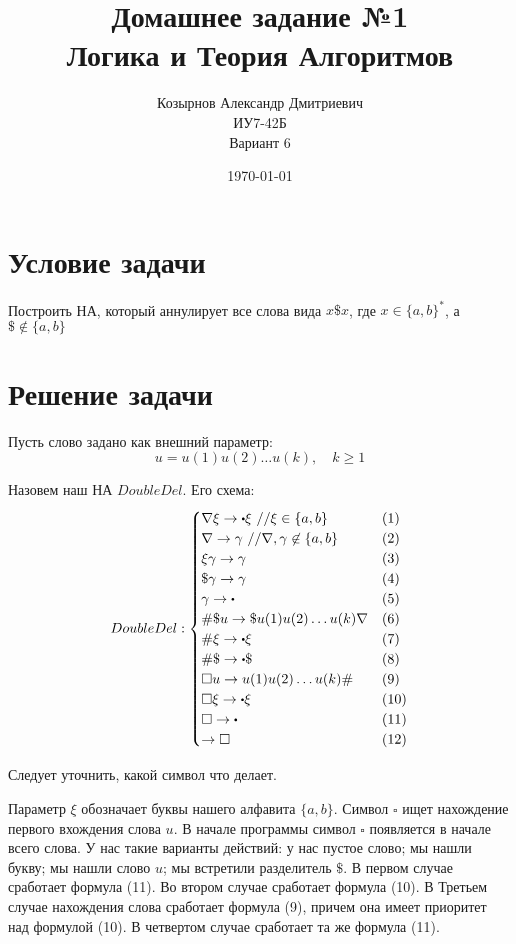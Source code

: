

\title{Домашнее задание №1\\ Логика и Теория Алгоритмов}
\author{Козырнов Александр Дмитриевич\\ ИУ7-42Б\\Вариант 6}
\date{\today}


\maketitle
\tableofcontents
\newpage

\section{Условие задачи}
Построить НА, который аннулирует все слова вида $x\$x$, где
$x \in \{a,b\}^{*}$, а $\$ \not\in \{a,b\} $

\section{Решение задачи}
Пусть слово задано как внешний параметр:
\begin{equation*}
    \boxed{u = u(1)u(2)\ldots u(k),\quad k \ge 1}
\end{equation*}

Назовем наш НА $DoubleDel$. Его схема:
\[
DoubleDel: \begin{cases}
    \nabla\xi \to \bigcdot \xi \text{ //} \xi \in \{a,b\}  & (1)\\
    \nabla  \to \gamma \text{ //}\nabla, \gamma  \not\in \{a,b\} & (2)\\
    \xi\gamma \to \gamma & (3)\\
    \$\gamma \to \gamma & (4)\\
    \gamma  \to \bigcdot & (5)\\
    \#\$u \to \$u(1)u(2)\ldots u(k)\nabla  & (6)\\
    \#\xi \to \bigcdot\xi & (7)\\
    \#\$ \to \bigcdot\$ & (8)\\
    \square u \to u(1)u(2)\ldots u(k) \# & (9)\\
    \square\xi \to \bigcdot \xi & (10)\\
    \square \to \bigcdot& (11) \\
    \to \square & (12)
\end{cases}
\]

Следует уточнить, какой символ что делает.

Параметр $\xi$ обозначает буквы нашего алфавита
 $\{a,b\}$.  Символ $\square$ ищет нахождение первого вхождения слова $u$. В начале программы 
 символ $\square$ появляется в начале всего слова. У нас такие варианты действий:
 у нас пустое слово; мы нашли букву; мы нашли слово  $u$; мы встретили разделитель $\$$.
 В первом случае сработает формула (11). Во втором случае сработает формула (10).
 В Третьем случае нахождения слова сработает формула (9), причем она имеет приоритет над формулой
 (10). В четвертом случае сработает та же формула (11).

